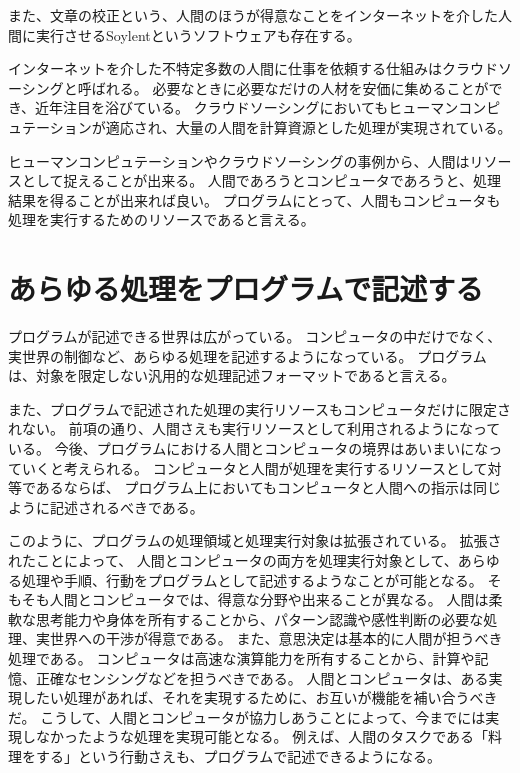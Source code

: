 また、文章の校正という、人間のほうが得意なことをインターネットを介した人間に実行させるSoylent\cite{soylent}というソフトウェアも存在する。

インターネットを介した不特定多数の人間に仕事を依頼する仕組みはクラウドソーシングと呼ばれる。
必要なときに必要なだけの人材を安価に集めることができ、近年注目を浴びている。
クラウドソーシングにおいてもヒューマンコンピュテーションが適応され、大量の人間を計算資源とした処理が実現されている。

ヒューマンコンピュテーションやクラウドソーシングの事例から、人間はリソースとして捉えることが出来る。
人間であろうとコンピュータであろうと、処理結果を得ることが出来れば良い。
プログラムにとって、人間もコンピュータも処理を実行するためのリソースであると言える。

\section{あらゆる処理をプログラムで記述する}\label{ux3042ux3089ux3086ux308bux51e6ux7406ux3092ux30d7ux30edux30b0ux30e9ux30e0ux3067ux8a18ux8ff0ux3059ux308b}

プログラムが記述できる世界は広がっている。
コンピュータの中だけでなく、実世界の制御など、あらゆる処理を記述するようになっている。
プログラムは、対象を限定しない汎用的な処理記述フォーマットであると言える。

また、プログラムで記述された処理の実行リソースもコンピュータだけに限定されない。
前項の通り、人間さえも実行リソースとして利用されるようになっている。
今後、プログラムにおける人間とコンピュータの境界はあいまいになっていくと考えられる。
コンピュータと人間が処理を実行するリソースとして対等であるならば、
プログラム上においてもコンピュータと人間への指示は同じように記述されるべきである。

このように、プログラムの処理領域と処理実行対象は拡張されている。
拡張されたことによって、
人間とコンピュータの両方を処理実行対象として、あらゆる処理や手順、行動をプログラムとして記述するようなことが可能となる。
そもそも人間とコンピュータでは、得意な分野や出来ることが異なる。
人間は柔軟な思考能力や身体を所有することから、パターン認識や感性判断の必要な処理、実世界への干渉が得意である。
また、意思決定は基本的に人間が担うべき処理である。
コンピュータは高速な演算能力を所有することから、計算や記憶、正確なセンシングなどを担うべきである。
人間とコンピュータは、ある実現したい処理があれば、それを実現するために、お互いが機能を補い合うべきだ。
こうして、人間とコンピュータが協力しあうことによって、今までには実現しなかったような処理を実現可能となる。
例えば、人間のタスクである「料理をする」という行動さえも、プログラムで記述できるようになる。

